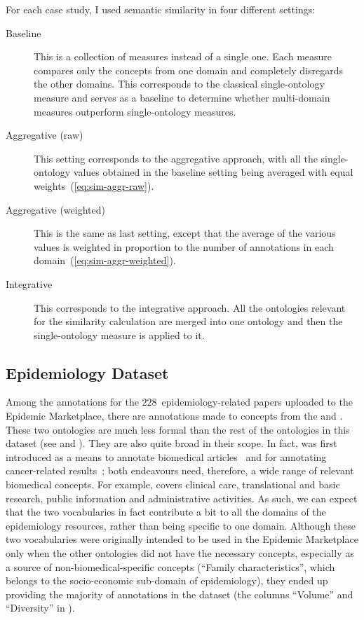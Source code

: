 For each case study, I used semantic similarity in four different settings:
\begin{description}
    \item[Baseline] This is a collection of measures instead of a single one. Each measure compares only the concepts from one domain and completely disregards the other domains. This corresponds to the classical single-ontology measure and serves as a baseline to determine whether multi-domain measures outperform single-ontology measures.
    \item[Aggregative (raw)] This setting corresponds to the aggregative approach, with all the single-ontology values obtained in the baseline setting being averaged with equal weights~(\eqref{eq:sim-aggr-raw}).
    \item[Aggregative (weighted)] This is the same as last setting, except that the average of the various values is weighted in proportion to the number of annotations in each domain~(\eqref{eq:sim-aggr-weighted}).
    \item[Integrative] This corresponds to the integrative approach. All the ontologies relevant for the similarity calculation are merged into one ontology and then the single-ontology measure is applied to it.
\end{description}


\subsection{Epidemiology Dataset} \label{sub:results/epiwork}

Among the annotations for the $228$~epidemiology-related papers uploaded to the Epidemic Marketplace, there are annotations made to concepts from the  and . These two ontologies are much less formal than the rest of the ontologies in this dataset (see  and ). They are also quite broad in their scope. In fact,  was first introduced as a means to annotate biomedical articles~\citep{Rogers1963} and  for annotating cancer-related results~\citep{Coronado2004}; both endeavours need, therefore, a wide range of relevant biomedical concepts. For example,  covers clinical care, translational and basic research, public information and administrative activities. As such, we can expect that the two vocabularies in fact contribute a bit to all the domains of the epidemiology resources, rather than being specific to one domain. Although these two vocabularies were originally intended to be used in the Epidemic Marketplace only when the other ontologies did not have the necessary concepts, especially as a source of non-biomedical-specific concepts (\eg ``Family characteristics'', which belongs to the socio-economic sub-domain of epidemiology), they ended up providing the majority of annotations in the dataset (\cf the columns ``Volume'' and ``Diversity'' in ).

